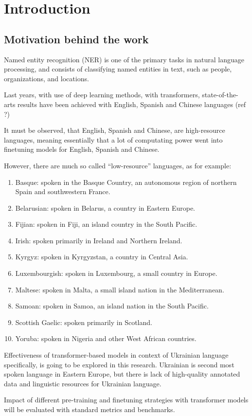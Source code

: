 \documentclass[a4paper,12pt]{report}
\begin{document}
\chapter{Introduction}
\section{Motivation behind the work }

Named entity recognition (NER)\cite{wiki:Named-entity_recognition} is one of the primary tasks in natural language processing, and consists of classifying named entities in text, such as people, organizations, and locations. 
\par 
Last years, with use of deep learning methods, with transformers, state-of-the-arts results have been achieved with English, Spanish and Chinese languages (ref ?) 
\par 
It must be observed, that English, Spanish and Chinese, are high-resource languages,  meaning essentially that a lot of computating power went into finetuning models for English, Spanish and Chinese. 
\par
However, there are much so called “low-resource” languages, as for example: 
\par
\begin{enumerate}
    \item     Basque: spoken in the Basque Country, an autonomous region of northern Spain and southwestern France. 
    \item     Belarusian: spoken in Belarus, a country in Eastern Europe. 
    \item     Fijian: spoken in Fiji, an island country in the South Pacific. 
    \item     Irish: spoken primarily in Ireland and Northern Ireland. 
    \item     Kyrgyz: spoken in Kyrgyzstan, a country in Central Asia. 
    \item     Luxembourgish: spoken in Luxembourg, a small country in Europe. 
    \item     Maltese: spoken in Malta, a small island nation in the Mediterranean. 
    \item     Samoan: spoken in Samoa, an island nation in the South Pacific. 
    \item     Scottish Gaelic: spoken primarily in Scotland. 
    \item     Yoruba: spoken in Nigeria and other West African countries. 
\end{enumerate}
\par
Effectiveness of transformer-based models in context of Ukrainian language specifically, is going to be explored in this research. Ukrainian is second most spoken language in Eastern Europe, but there is lack of high-quality annotated data and linguistic resources for Ukrainian language.
\par
Impact of different pre-training and finetuning strategies with transformer models will be evaluated with standard metrics and benchmarks.
\end{document}
